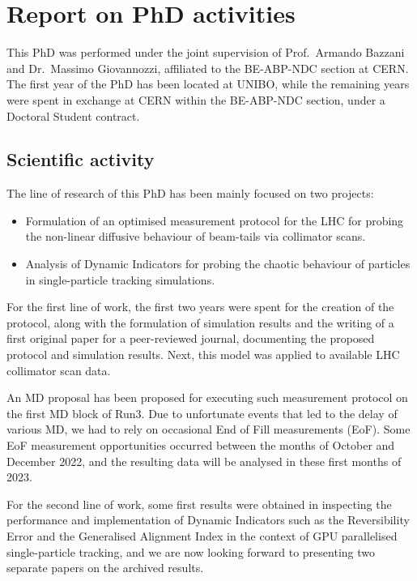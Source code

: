 \chapter*{Report on PhD activities}
\sectionmark{}

This PhD was performed under the joint supervision of Prof.~Armando Bazzani and Dr.~Massimo Giovannozzi, affiliated to the BE-ABP-NDC section at CERN. The first year of the PhD has been located at UNIBO, while the remaining years were spent in exchange at CERN within the BE-ABP-NDC section, under a Doctoral Student contract.

\section*{Scientific activity}

The line of research of this PhD has been mainly focused on two projects:
\begin{itemize}
    \item Formulation of an optimised measurement protocol for the LHC for
probing the non-linear diffusive behaviour of beam-tails via collimator
scans.
    \item Analysis of Dynamic Indicators for probing the chaotic behaviour of particles
in single-particle tracking simulations.
\end{itemize}

For the first line of work, the first two years were spent for the creation of the protocol, along with the formulation of simulation results and the writing of a first original paper for a peer-reviewed journal, documenting the proposed protocol and simulation results. Next, this
model was applied to available LHC collimator scan data.

An MD proposal has been proposed for executing such measurement
protocol on the first MD block of Run3. Due to unfortunate events that led to
the delay of various MD, we had to rely on occasional End of Fill
measurements (EoF). Some EoF measurement opportunities occurred between the months of October and December 2022, and the resulting data will be analysed in these first months of 2023.

For the second line of work, some first results were obtained in inspecting
the performance and implementation of Dynamic Indicators such as the
Reversibility Error and the Generalised Alignment Index in the context of GPU
parallelised single-particle tracking, and we are now looking forward to presenting
two separate papers on the archived results.

